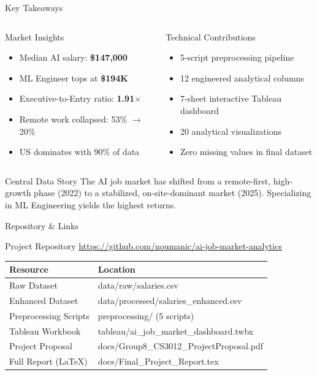 \documentclass[aspectratio=169]{beamer}
\begin{document}
\begin{frame}{Key Takeaways}
\begin{columns}
\begin{block}{Market Insights}
\begin{itemize}
    \item Median AI salary: \textbf{\$147,000}
    \item ML Engineer tops at \textbf{\$194K}
    \item Executive-to-Entry ratio: \textbf{1.91$\times$}
    \item Remote work collapsed: 53\% $\rightarrow$ 20\%
    \item US dominates with 90\% of data
\end{itemize}
\end{block}
\begin{block}{Technical Contributions}
\begin{itemize}
    \item 5-script preprocessing pipeline
    \item 12 engineered analytical columns
    \item 7-sheet interactive Tableau dashboard
    \item 20 analytical visualizations
    \item Zero missing values in final dataset
\end{itemize}
\end{block}
\end{columns}
\vspace{0.3cm}
\begin{alertblock}{Central Data Story}
The AI job market has shifted from a remote-first, high-growth phase (2022) to a stabilized, on-site-dominant market (2025). Specializing in ML Engineering yields the highest returns.
\end{alertblock}
\end{frame}

\begin{frame}{Repository \& Links}
\begin{block}{Project Repository}
\centering
\large \url{https://github.com/noumanic/ai-job-market-analytics}
\end{block}
\vspace{0.3cm}
\footnotesize
\begin{table}
\centering
\begin{tabular}{ll}
\toprule
\textbf{Resource} & \textbf{Location} \\
\midrule
Raw Dataset & data/raw/salaries.csv \\
Enhanced Dataset & data/processed/salaries\_enhanced.csv \\
Preprocessing Scripts & preprocessing/ (5 scripts) \\
Tableau Workbook & tableau/ai\_job\_market\_dashboard.twbx \\
Project Proposal & docs/Group8\_CS3012\_ProjectProposal.pdf \\
Full Report (LaTeX) & docs/Final\_Project\_Report.tex \\
\bottomrule
\end{tabular}
\end{table}
\end{frame}
\end{document}
